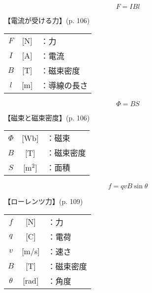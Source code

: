 \documentclass[10pt]{jarticle}
\begin{document}
\newpage
\[
F = I B l
\]


\vskip3mm
【電流が受ける力】{\footnotesize (p. 106)}

\begin{tabular}{ccl}
$F$	&[N]	&：力 \\
$I$	&[A]	&：電流\\
$B$	&[T]	&：磁束密度\\
$l$	&[m]	&：導線の長さ\\
\end{tabular}




\newpage
\[
\Phi = B S
\]


\vskip3mm
【磁束と磁束密度】{\footnotesize (p. 106)}

\begin{tabular}{ccl}
$\Phi$	&[Wb]	&：磁束\\
$B$	&[T]	&：磁束密度\\
$S$	&[m$^2$]	&：面積
\end{tabular}





\newpage
\[
f = q v B \sin \theta
\]


\vskip3mm
【ローレンツ力】{\footnotesize (p. 109)}

\begin{tabular}{ccl}
$f$	&[N]	&：力 \\
$q$	&[C]	&：電荷\\
$v$	&[m/s]	&：速さ\\
$B$	&[T]	&：磁束密度\\
$\theta$	&[rad]	&：角度
\end{tabular}
\end{document}
